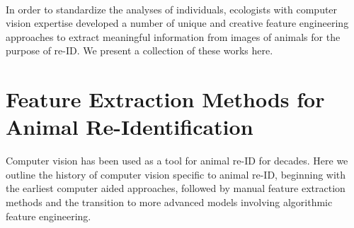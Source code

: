 \documentclass[11pt]{article}
\begin{document}
\newline
\\
In order to standardize the analyses of individuals, ecologists with computer vision expertise developed a number of unique and creative feature engineering approaches to extract meaningful information from images of animals for the purpose of re-ID. We present a collection of these works here. 

\section*{Feature Extraction Methods for Animal Re-Identification}

Computer vision has been used as a tool for animal re-ID for decades. Here we outline the history of computer vision specific to animal re-ID, beginning with the earliest computer aided approaches, followed by manual feature extraction methods and the transition to more advanced models involving algorithmic feature engineering.  
\newline
\\
\end{document}
